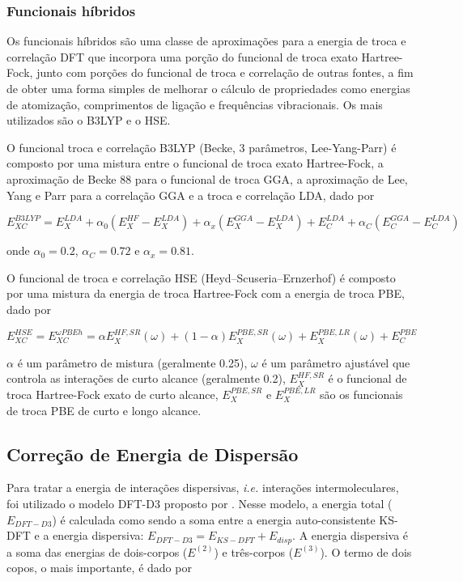 		\subsubsection{Funcionais híbridos}	
		
		Os funcionais híbridos são uma classe de aproximações para a energia de troca e correlação DFT que incorpora uma porção do funcional de troca exato Hartree-Fock, junto com porções do funcional de troca e correlação de outras fontes, a fim de obter uma forma simples de melhorar o cálculo de propriedades como energias de atomização, comprimentos de ligação e frequências vibracionais. Os mais utilizados são o B3LYP e o HSE. 
		
		O funcional troca e correlação B3LYP (Becke, 3 parâmetros, Lee-Yang-Parr) é composto por uma mistura entre o funcional de troca exato Hartree-Fock, a aproximação de Becke 88 para o funcional de troca GGA, a aproximação de Lee, Yang e Parr para a correlação GGA e a troca e correlação LDA, dado por
		
		\begin{equation}
			E_{XC}^{B3LYP} = E_X^{LDA} + \alpha_0(E_X^{HF} - E_X^{LDA}) + \alpha_x(E_X^{GGA} - E_X^{LDA}) + E_C^{LDA} + \alpha_C(E_C^{GGA} - E_C^{LDA})
		\end{equation}
		
		onde $\alpha_0 = 0.2$, $\alpha_C = 0.72$ e $\alpha_x=0.81$. 
		
		O funcional de troca e correlação HSE (Heyd–Scuseria–Ernzerhof) é composto por uma mistura da energia de troca Hartree-Fock com a energia de troca PBE, dado por
		
		\begin{equation}
			E_{XC}^{HSE} = E_{XC}^{\omega PBEh} = \alpha E_X^{HF,SR}(\omega) + (1- \alpha)E_X^{PBE,SR}(\omega) + E_X^{PBE,LR}(\omega) + E_C^{PBE}
		\end{equation}
		
		$\alpha$ é um parâmetro de mistura (geralmente 0.25), $\omega$ é um parâmetro ajustável que controla as interações de curto alcance (geralmente 0.2), $E_X^{HF,SR}$ é o funcional de troca Hartree-Fock exato de curto alcance, $E_X^{PBE,SR}$ e $E_X^{PBE,LR}$ são os funcionais de troca PBE de curto e longo alcance. 


	\subsection{Correção de Energia de Dispersão}
		
			Para tratar a energia de interações dispersivas, \textit{i.e.} interações intermoleculares, foi utilizado o modelo DFT-D3 proposto por \cite{grimme2006semiempirical}. Nesse modelo, a energia total ($E_{DFT-D3}$) é calculada como sendo a soma entre a energia auto-consistente KS-DFT e a energia dispersiva: $E_{DFT-D3} = E_{KS-DFT} + E_{disp}$. A energia dispersiva é a soma das energias de dois-corpos ($E^{(2)}$) e três-corpos ($E^{(3)}$). O termo de dois copos, o mais importante, é dado por
			
